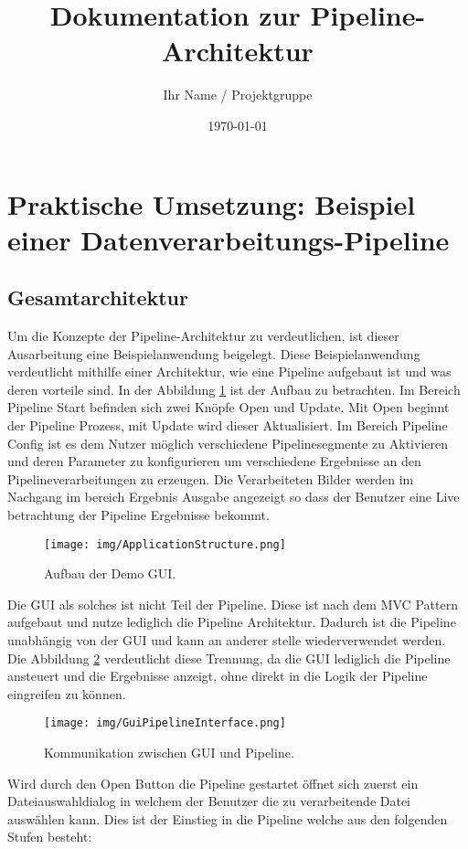 \documentclass[a4paper]{article} %
\title{Dokumentation zur Pipeline-Architektur}
\author{Ihr Name / Projektgruppe}
\date{\today}
\begin{document}
\section{Praktische Umsetzung: Beispiel einer Datenverarbeitungs-Pipeline}
\subsection{Gesamtarchitektur}
Um die Konzepte der Pipeline-Architektur zu verdeutlichen, ist dieser Ausarbeitung eine Beispielanwendung beigelegt. Diese Beispielanwendung verdeutlicht mithilfe einer Architektur, wie eine Pipeline aufgebaut ist und was deren vorteile sind.
In der Abbildung \ref{fig:application_structure} ist der Aufbau zu betrachten. Im Bereich Pipeline Start befinden sich zwei Knöpfe Open und Update. Mit Open beginnt der Pipeline Prozess, mit Update wird dieser Aktualisiert. Im Bereich Pipeline Config ist es dem Nutzer möglich verschiedene Pipelinesegmente zu Aktivieren und deren Parameter zu konfigurieren um verschiedene Ergebnisse an den Pipelineverarbeitungen zu erzeugen. Die Verarbeiteten Bilder werden im Nachgang im bereich Ergebnis Ausgabe angezeigt so dass der Benutzer eine Live betrachtung der Pipeline Ergebnisse bekommt.

\begin{figure}[htbp]
    \centering
    \texttt{[image: img/ApplicationStructure.png]}
    \caption{Aufbau der Demo GUI.}
    \label{fig:application_structure}
\end{figure}

\begin{samepage}
Die GUI als solches ist nicht Teil der Pipeline. Diese ist nach dem MVC Pattern aufgebaut und nutze lediglich die Pipeline Architektur. Dadurch ist die Pipeline unabhängig von der GUI und kann an anderer stelle wiederverwendet werden. Die Abbildung \ref{fig:gui_pipeline_interface} verdeutlicht diese Trennung, da die GUI lediglich die Pipeline ansteuert und die Ergebnisse anzeigt, ohne direkt in die Logik der Pipeline eingreifen zu können.

\begin{figure}[htbp]
    \centering
    \texttt{[image: img/GuiPipelineInterface.png]}
    \caption{Kommunikation zwischen GUI und Pipeline.}
    \label{fig:gui_pipeline_interface}
\end{figure}
\end{samepage}

Wird durch den Open Button die Pipeline gestartet öffnet sich zuerst ein Dateiauswahldialog in welchem der Benutzer die zu verarbeitende Datei auswählen kann. Dies ist der Einstieg in die Pipeline welche aus den folgenden Stufen besteht:
\end{document}
